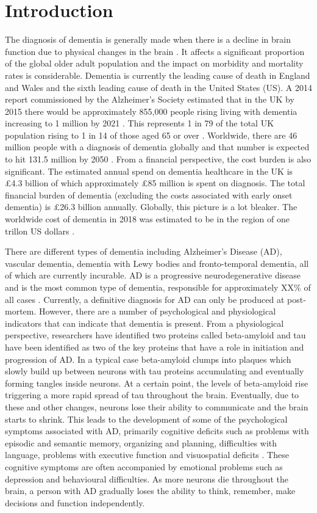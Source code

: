 \documentclass[12pt]{article}
\begin{document}
\section{Introduction}\label{introduction}
The diagnosis of dementia is generally made when there is a decline in brain function due to physical changes in the brain \cite{Albert2011}. It affects a significant proportion of the global older adult population and the impact on morbidity and mortality rates is considerable. Dementia is currently the leading cause of death in England and Wales and the sixth leading cause of death in the United States (US). A 2014 report commissioned by the Alzheimer's Society estimated that in the UK by 2015 there would be approximately 855,000 people rising living with dementia increasing to 1 million by 2021 \cite{}. This represents 1 in 79 of the total UK population rising to 1 in 14 of those aged 65 or over \cite{AlzheimersSociety2014}. Worldwide, there are 46 million people with a diagnosis of dementia globally and that number is expected to hit 131.5 million by 2050 \cite{Prince2015}. From a financial perspective, the cost burden is also significant. The estimated annual spend on dementia healthcare in the UK is £4.3 billion of which approximately £85 million is spent on diagnosis. The total financial burden of dementia (excluding the costs associated with early onset dementia) is £26.3 billion annually. Globally, this picture is a lot bleaker. The worldwide cost of dementia in 2018 was estimated to be in the region of one trillon US dollars \cite{}.
\par 
There are different types of dementia including Alzheimer's Disease (AD), vascular dementia, dementia with Lewy bodies and fronto-temporal dementia, all of which are currently incurable. AD is a progressive neurodegenerative disease and is the most common type of dementia, responsible for approximately XX\% of all cases \cite{}. Currently, a definitive diagnosis for AD can only be produced at post-mortem. However, there are a number of psychological and physiological indicators that can indicate that dementia is present. From a physiological perspective, researchers have identified two proteins called beta-amyloid and tau have been identified as two of the key proteins that have a role in initiation and progression of AD. In a typical case beta-amyloid clumps into plaques which slowly build up between neurons with tau proteins accumulating and eventually forming tangles inside neurons. At a certain point, the levels of beta-amyloid rise triggering a more rapid spread of tau throughout the brain. Eventually, due to these and other changes, neurons lose their ability to communicate and the brain starts to shrink. This leads to the development of some of the psychological symptoms associated with AD, primarily cognitive deficits such as problems with episodic and semantic memory, organizing and planning, difficulties with language, problems with executive function and visuospatial deficits \cite{McKhann2011}. These cognitive symptoms are often accompanied by emotional problems such as depression and behavioural difficulties. As more neurons die throughout the brain, a person with AD gradually loses the ability to think, remember, make decisions and function independently.
\end{document}
